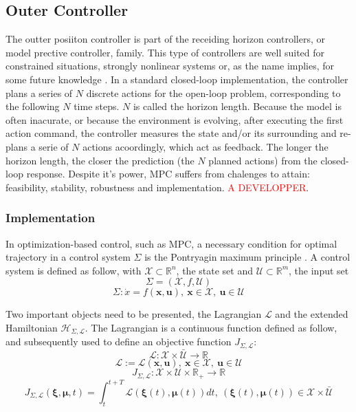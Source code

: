 \documentclass[a4paper, 12pt]{report}
\begin{document}
\subsection{Outer Controller}

The outter posiiton controller is part of the receiding horizon controllers, or model prective controller, family. This type of controllers are well suited for constrained situations, strongly nonlinear systems or, as the name implies, for some future knowledge \cite{Borelli2015}. In a standard closed-loop implementation, the controller plans a series of $N$ discrete actions for the open-loop problem, corresponding to the following $N$ time steps. $N$ is called the horizon length. Because the model is often inacurate, or because the environment is evolving, after executing the first action command, the controller measures the state and/or its surrounding and re-plans a serie of $N$ actions acoordingly, which act as feedback. The longer the horizon length, the closer the prediction (the $N$ planned actions) from the closed-loop response. Despite it's power, MPC suffers from chalenges to attain: feasibility, stability, robustness and implementation. \textcolor{red}{A DEVELOPPER}.

\subsubsection{Implementation}
In optimization-based control, such as MPC, a necessary condition for optimal trajectory in a control system $\Sigma$ is the Pontryagin maximum principle \cite{Pontryagin1987, Lewis2006, Murray2010}. A control system is defined as follow, with $\mathcal{X} \subset \mathbb{R}^n$, the state set and $\mathcal{U} \subset \mathbb{R}^m$, the input set
\[ \Sigma = (\mathcal{X}, f, \mathcal{U}) \]
\[ \Sigma: \dot x = f(\boldsymbol{x}, \boldsymbol{u}),\ \boldsymbol{x} \in \mathcal{X},\ \boldsymbol{u} \in \mathcal{U} \]

Two important objects need to be presented, the Lagrangian $\mathcal{L}$ and the extended Hamiltonian $\mathcal{H}_{\Sigma,\mathcal{L}}$. The Lagrangian is a continuous function defined as follow, and subsequently used to define an objective function $J_{\Sigma,\mathcal{L}}$:
\[ \mathcal{L}: \mathcal{X} \times \bar{\mathcal{U}} \rightarrow \mathbb{R} \]
\[ \mathcal{L} := \mathcal{L}(\boldsymbol{x}, \boldsymbol{u}),\ \boldsymbol{x} \in \mathcal{X},\ \boldsymbol{u} \in \mathcal{U} \]
\[ J_{\Sigma,\mathcal{L}}: \mathcal{X} \times \mathcal{U} \times \mathbb{R_+} \rightarrow \mathbb{R} \]
\[ J_{\Sigma,\mathcal{L}}(\boldsymbol{\xi}, \boldsymbol{\mu}, t) = \int_{t}^{t+T} \mathcal{L}(\boldsymbol{\xi}(t), \boldsymbol{\mu}(t))dt, \ (\boldsymbol{\xi}(t), \boldsymbol{\mu}(t)) \in  \mathcal{X} \times \bar{\mathcal{U}}\]
\end{document}
